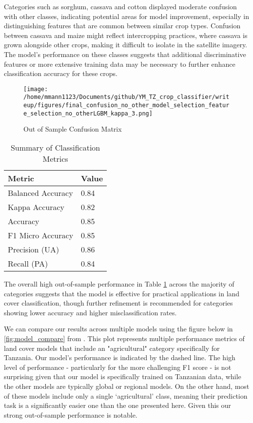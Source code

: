 \documentclass[journal]{IEEEtran}
\begin{document}
Categories such as sorghum, cassava and cotton displayed moderate confusion with other classes, indicating potential areas for model improvement, especially in distinguishing features that are common between similar crop types.  Confusion between cassava and maize might reflect intercropping practices, where cassava is grown alongside other crops, making it difficult to isolate in the satellite imagery. The model's performance on these classes suggests that additional discriminative features or more extensive training data may be necessary to further enhance classification accuracy for these crops.

\begin{figure}[!t] 
    \centering
    \texttt{[image: /home/mmann1123/Documents/github/YM\_TZ\_crop\_classifier/writeup/figures/final\_confusion\_no\_other\_model\_selection\_feature\_selection\_no\_otherLGBM\_kappa\_3.png]} %
    \caption{Out of Sample Confusion Matrix}
    \label{fig:oos_confusion} %
\end{figure}

\begin{table} 
\centering
\begin{tabular}{@{}ll@{}}
\toprule
Metric              & Value                 \\ \midrule
Balanced Accuracy   & 0.84    \\
Kappa Accuracy      & 0.82    \\
Accuracy            & 0.85    \\
F1 Micro Accuracy   & 0.85    \\ 
Precision (UA)   & 0.86    \\ 
Recall (PA)   & 0.84    \\ 
\bottomrule
\end{tabular}
\caption{Summary of Classification Metrics}
\label{tab:metrics}
\end{table}

The overall high out-of-sample performance in Table \ref{tab:metrics} across the majority of categories suggests that the model is effective for practical applications in land cover classification, though further refinement is recommended for categories showing lower accuracy and higher misclassification rates.

We can compare our results across multiple models using the figure below in \ref{fig:model_compare} from \cite{kerner2024accurate}. This plot represents multiple performance metrics of land cover models that include an "agricultural" category specifically for Tanzania. Our model’s performance is indicated by the dashed line. The high level of performance - particularly for the more challenging F1 score - is not surprising given that our model is specifically trained on Tanzanian data, while the other models are typically global or regional models. On the other hand, most of these models include only a single ‘agricultural’ class, meaning their prediction task is a significantly easier one than the one presented here. Given this our strong out-of-sample performance is notable.
\end{document}
